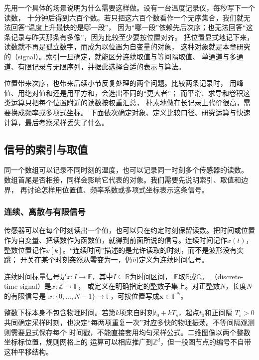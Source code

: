 先用一个具体的场景说明为什么需要这样做。设有一台温度记录仪，每秒写下一个读数，
十分钟后得到六百个数。若只把这六百个数看作一个无序集合，我们就无法回答“温度上升最快的是哪一段”，
因为“哪一段”依赖先后次序；也无法回答“这条记录与昨天那条有多像”，因为比较至少要按位置对齐。
把位置显式地记下来，读数就不再是孤立数字，而成为以位置为自变量的对象，
这种对象就是本章研究的（signal）。索引一旦确定，就能区分连续取值与等间隔取值、
单通道与多通道、有限记录与无限序列，并据此选择合适的表示与算法。

位置带来次序，也带来后续小节反复处理的两个问题。比较两条记录时，
用峰值、用绝对值和还是用平方和，会选出不同的“更大者”；
而平滑、求导和卷积这类运算只把每个位置附近的读数按权重汇总，
朴素地做在长记录上代价很高，需要换成频率或多项式坐标。
下面依次确定对象、定义比较口径、研究运算与快速计算，最后考察采样丢失了什么。

\subsection{信号的索引与取值}

同一个数组可以记录不同时刻的温度，也可以记录同一时刻多个传感器的读数。
数组首尾是否相接，同样会影响它代表的对象。我们需要先说明索引、取值和边界，
再讨论怎样用位置值、频率系数或多项式坐标表示这条信号。

\subsubsection{连续、离散与有限信号}

传感器可以在每个时刻读出一个值，也可以只在约定时刻保留读数。把时间或位置
作为自变量、把读数作为函数值，就得到前面所说的信号。连续时间记作$x(t)$，
整数位置记作$x[k]$。“连续时间”描述的是允许读取的时刻，而不是波形没有突跳；
开关在某个时刻突然从零变为一，仍可定义为连续时间信号。

\begin{definition}[信号的索引类型]
  \label{def:signal-index-types}
  连续时间标量信号是$x:I\to\mathbb F$，其中$I\subseteq\mathbb R$为时间区间，
  $\mathbb F$取$\mathbb R$或$\mathbb C$。
  （discrete-time signal）是$x:\mathbb Z\to\mathbb F$，
  或定义在明确指定的整数子集上。对正整数$N$，长度$N$的有限信号是
  $x:\{0,\ldots,N-1\}\to\mathbb F$，可按位置写成$\bm x\in\mathbb F^N$。
\end{definition}

整数下标本身不包含物理时间。若第$k$项来自时刻$t_0+kT_s$，起点$t_0$和正间隔
$T_s>0$共同确定采样时刻，也决定“每两项重复一次”对应多快的物理振荡。不等间隔观测则需要显式保存每个
时间戳，不能直接套用均匀采样公式。二维图像以两个整数坐标标位置，规则网格上的
运算可以相应推广到$\mathbb Z^d$，但一般图节点的编号不自带这种平移结构。

